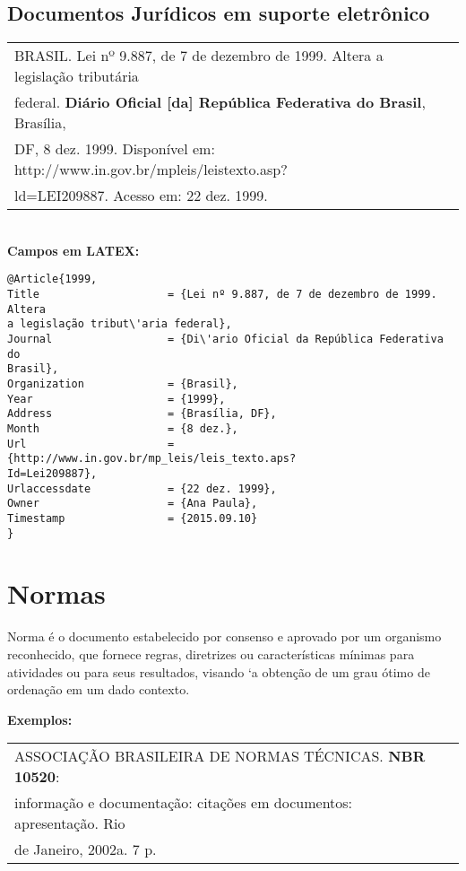 \subsection{Documentos Jurídicos em suporte eletrônico}

\begin{tabular}{|l|c|} \hline
	BRASIL. Lei nº 9.887, de 7 de dezembro de 1999. Altera a legislação tribut\'aria\\
	federal. \textbf{Di\'ario Oficial [da] República Federativa do Brasil}, Brasília,\\
	DF, 8 dez. 1999. Disponível em: http://www.in.gov.br/mpleis/leistexto.asp?\\
	ld=LEI209887. Acesso em: 22 dez. 1999. 
	\\\hline
\end{tabular} \\

\textbf{Campos em LATEX:} 

\begin{verbatim}
@Article{1999,
Title                    = {Lei nº 9.887, de 7 de dezembro de 1999. Altera 
a legislação tribut\'aria federal},
Journal                  = {Di\'ario Oficial da República Federativa do 
Brasil},
Organization             = {Brasil},
Year                     = {1999},
Address                  = {Brasília, DF},
Month                    = {8 dez.},
Url                      = {http://www.in.gov.br/mp_leis/leis_texto.aps?
Id=Lei209887},
Urlaccessdate            = {22 dez. 1999},
Owner                    = {Ana Paula},
Timestamp                = {2015.09.10}
}
\end{verbatim}


\section{Normas}

Norma \'e o documento estabelecido por consenso e aprovado por um organismo reconhecido, que fornece regras, diretrizes ou características mínimas para atividades ou para seus resultados, visando `a obtenção de um grau ótimo de ordenação em um dado contexto.

\textbf{Exemplos:} \\

\begin{tabular}{|l|c|} \hline
	ASSOCIAÇÃO BRASILEIRA DE NORMAS TÉCNICAS. \textbf{NBR 10520}: \\informação e documentação: citações em documentos: apresentação. Rio \\de Janeiro, 2002a. 7 p. 
	\\\hline
\end{tabular} \\

